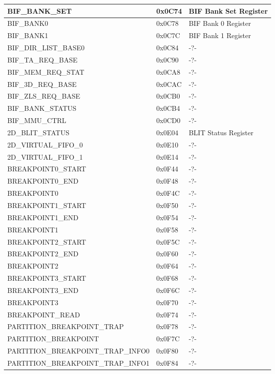 \begin{longtable}[c]{|m{}|C{0.10\textwidth}|m{0.42\textwidth}|}
	BIF\_BANK\_SET & 0x0C74 & BIF Bank Set Register \\ \hline
	BIF\_BANK0 & 0x0C78 & BIF Bank 0 Register \\ \hline
	BIF\_BANK1 & 0x0C7C & BIF Bank 1 Register \\ \hline
	BIF\_DIR\_LIST\_BASE0 & 0x0C84 & -?- \\ \hline
	BIF\_TA\_REQ\_BASE & 0x0C90 & -?- \\ \hline
	BIF\_MEM\_REQ\_STAT & 0x0CA8 & -?- \\ \hline
	BIF\_3D\_REQ\_BASE & 0x0CAC & -?- \\ \hline
	BIF\_ZLS\_REQ\_BASE & 0x0CB0 & -?- \\ \hline
	BIF\_BANK\_STATUS & 0x0CB4 & -?- \\ \hline
	BIF\_MMU\_CTRL & 0x0CD0 & -?- \\ \hline
	2D\_BLIT\_STATUS & 0x0E04 & BLIT Status Register \\ \hline
	2D\_VIRTUAL\_FIFO\_0 & 0x0E10 & -?- \\ \hline
	2D\_VIRTUAL\_FIFO\_1 & 0x0E14 & -?- \\ \hline
	BREAKPOINT0\_START & 0x0F44 & -?- \\ \hline
	BREAKPOINT0\_END & 0x0F48 & -?- \\ \hline
	BREAKPOINT0 & 0x0F4C & -?- \\ \hline
	BREAKPOINT1\_START & 0x0F50 & -?- \\ \hline
	BREAKPOINT1\_END & 0x0F54 & -?- \\ \hline
	BREAKPOINT1 & 0x0F58 & -?- \\ \hline
	BREAKPOINT2\_START & 0x0F5C & -?- \\ \hline
	BREAKPOINT2\_END & 0x0F60 & -?- \\ \hline
	BREAKPOINT2 & 0x0F64 & -?- \\ \hline
	BREAKPOINT3\_START & 0x0F68 & -?- \\ \hline
	BREAKPOINT3\_END & 0x0F6C & -?- \\ \hline
	BREAKPOINT3 & 0x0F70 & -?- \\ \hline
	BREAKPOINT\_READ & 0x0F74 & -?- \\ \hline
	PARTITION\_BREAKPOINT\_TRAP & 0x0F78 & -?- \\ \hline
	PARTITION\_BREAKPOINT & 0x0F7C & -?- \\ \hline
	PARTITION\_BREAKPOINT\_TRAP\_INFO0 & 0x0F80 & -?- \\ \hline
	PARTITION\_BREAKPOINT\_TRAP\_INFO1 & 0x0F84 & -?- \\ \hline

\end{longtable}
